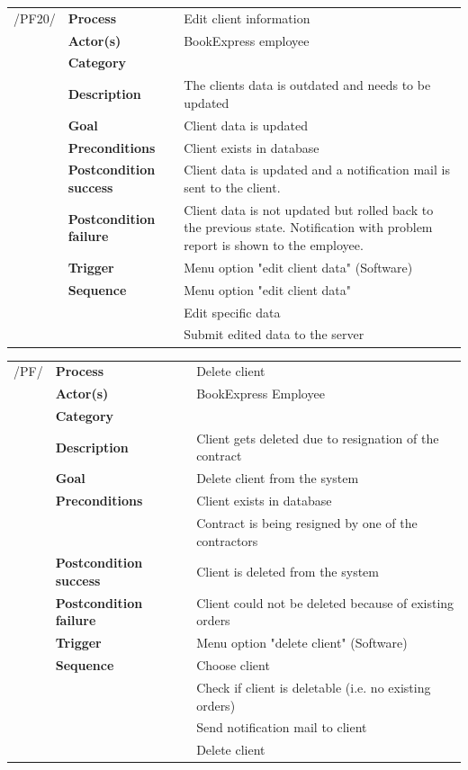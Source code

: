 \documentclass[11pt,a4paper,oneside,svgnames]{report}
\begin{document}
\begin{tabular}{p{1.5cm}p{3cm}p{8cm}}
/PF20/	& \textbf{Process} & Edit client information\\
		& \textbf{Actor(s)} & BookExpress employee\\
		& \textbf{Category} & \\
		& \textbf{Description}	 & The clients data is outdated and needs to be updated\\
		& \textbf{Goal} & Client data is updated\\
		& \textbf{Preconditions} & Client exists in database\\
		& \textbf{Postcondition success} & Client data is updated and a notification mail is sent to the client.\\
		& \textbf{Postcondition failure} & Client data is not updated but rolled back to the previous state. Notification with problem report is shown to the employee.\\
		& \textbf{Trigger} & Menu option "edit client data" (Software)\\
		& \textbf{Sequence} & Menu option "edit client data"\\
		& & Edit specific data\\
		& & Submit edited data to the server\\

\end{tabular}

\begin{tabular}{p{1.5cm}p{3cm}p{8cm}}

/PF/	& \textbf{Process} & Delete client\\ 
		& \textbf{Actor(s)} & BookExpress Employee\\ 
		& \textbf{Category} & \\
		& \textbf{Description}	 & Client gets deleted due to resignation of the contract\\ 
		& \textbf{Goal} & Delete client from the system\\
		& \textbf{Preconditions} & Client exists in database\\
		& & Contract is being resigned by one of the contractors\\
		& \textbf{Postcondition success} & Client is deleted from the system\\
		& \textbf{Postcondition failure} & Client could not be deleted because of existing orders\\
		& \textbf{Trigger} & Menu option "delete client" (Software)\\
		& \textbf{Sequence} & Choose client\\
		& & Check if client is deletable (i.e. no existing orders)\\
		& & Send notification mail to client\\
		& & Delete client\\
		
\end{tabular}
\end{document}
